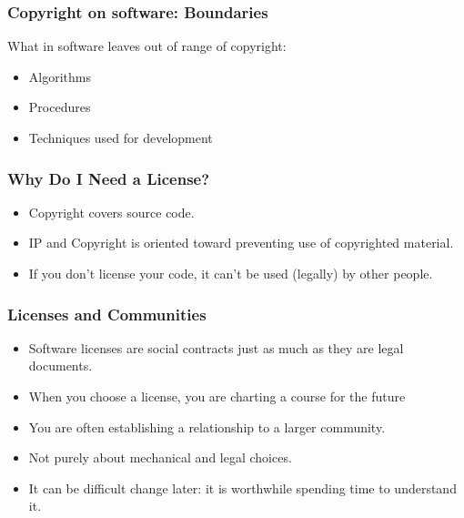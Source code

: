 
\begin{frame}
\frametitle{Copyright on software: Boundaries}

What in software leaves out of range of copyright:

\begin{itemize}
\item Algorithms 
\item Procedures 
\item Techniques used for development 
\end{itemize}

\end{frame}



\begin{frame}
\frametitle{Why Do I Need a License?}

\begin{itemize}
\item Copyright covers source code.
\item IP and Copyright is oriented toward preventing use of copyrighted material.
\item If you don't license your code, \alert{it can't be used (legally) by other people}.
\end{itemize}

\end{frame}




\begin{frame}
\frametitle{Licenses and Communities}

\begin{itemize}
\item Software licenses are social contracts just as much as they are legal documents.
\item When you choose a license, you are charting a course for the future
\item You are often establishing a relationship to a larger community.
\item Not purely about mechanical and legal choices.
\item It can be difficult change later: it is worthwhile spending time to understand it.
\end{itemize}

\end{frame}

